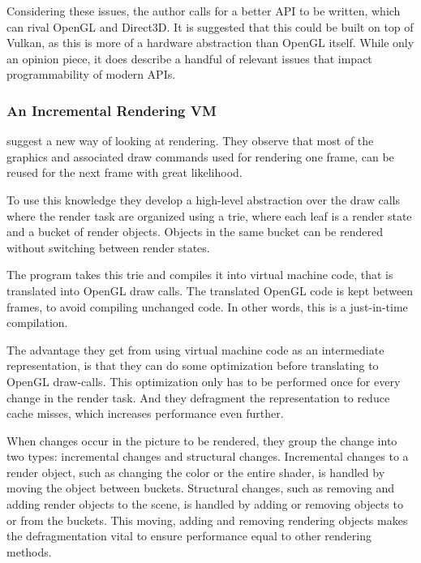  
Considering these issues, the author calls for a better \gls{API} to be written, which can rival OpenGL and Direct3D.
It is suggested that this could be built on top of Vulkan, as this is more of a hardware abstraction than OpenGL itself.
While only an opinion piece, it does describe a handful of relevant issues that impact programmability of modern \glspl{API}.



\subsubsection{An Incremental Rendering VM} 

\noindent \citet{haaser_2015_incremental} suggest a new way of looking at rendering. 
They observe that most of the graphics and associated draw commands used for rendering one frame, can be reused for the next frame with great likelihood.

To use this knowledge they develop a high-level abstraction over the draw calls where the render task are organized using a trie, where each leaf is a render state and a bucket of render objects. 
Objects in the same bucket can be rendered without switching between render states.

The program takes this trie and compiles it into virtual machine code, that is translated into OpenGL draw calls.
The translated OpenGL code is kept between frames, to avoid compiling unchanged code.
In other words, this is a just-in-time compilation.

The advantage they get from using virtual machine code as an intermediate representation, is that they can do some optimization before translating to OpenGL draw-calls.
This optimization only has to be performed once for every change in the render task.
And they defragment the representation to reduce cache misses, which increases performance even further. 

When changes occur in the picture to be rendered, they group the change into two types: incremental changes and structural changes.
Incremental changes to a render object, such as changing the color or the entire shader, is handled by moving the object between buckets.
Structural changes, such as removing and adding render objects to the scene, is handled by adding or removing objects to or from the buckets.
This moving, adding and removing rendering objects makes the defragmentation vital to ensure performance equal to other rendering methods.

